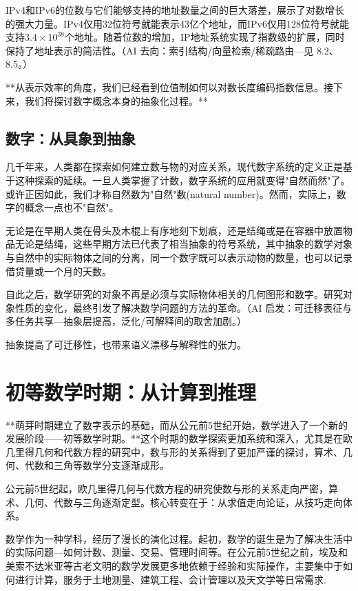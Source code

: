 IPv4和IPv6的位数与它们能够支持的地址数量之间的巨大落差，展示了对数增长的强大力量。IPv4仅用32位符号就能表示43亿个地址，而IPv6仅用128位符号就能支持{\bf $3.4 \times 10^{38}$}个地址。随着位数的增加，IP地址系统实现了指数级的扩展，同时保持了地址表示的简洁性。{（AI 去向：索引结构/向量检索/稀疏路由—见 8.2、8.5。）}

**从表示效率的角度，我们已经看到位值制如何以对数长度编码指数信息。接下来，我们将探讨数字概念本身的抽象化过程。**

\subsection{数字：从具象到抽象}


几千年来，人类都在探索如何建立数与物的对应关系，现代数字系统的定义正是基于这种探索的延续。一旦人类掌握了计数，数字系统的应用就变得"自然而然"了。或许正因如此，我们才称自然数为"自然"数(natural number)。然而，实际上，数字的概念一点也不"自然"。

无论是在早期人类在骨头及木棍上有序地刻下划痕，还是结绳或是在容器中放置物品无论是结绳，这些早期方法已代表了相当抽象的符号系统，其中抽象的数学对象与自然中的实际物体之间的分离，同一个数字既可以表示动物的数量，也可以记录借贷量或一个月的天数。

自此之后，数学研究的对象不再是必须与实际物体相关的几何图形和数字。研究对象性质的变化，最终引发了解决数学问题的方法的革命。{（AI 启发：可迁移表征与多任务共享—抽象层提高，泛化/可解释间的取舍加剧。）}

抽象提高了可迁移性，也带来语义漂移与解释性的张力。

\section{初等数学时期：从计算到推理}


**萌芽时期建立了数字表示的基础，而从公元前5世纪开始，数学进入了一个新的发展阶段——初等数学时期。**这个时期的数学探索更加系统和深入，尤其是在欧几里得几何和代数方程的研究中，数与形的关系得到了更加严谨的探讨，算术、几何、代数和三角等数学分支逐渐成形。

公元前5世纪起，欧几里得几何与代数方程的研究使数与形的关系走向严密，算术、几何、代数与三角逐渐定型。核心转变在于：从求值走向论证，从技巧走向体系。

数学作为一种学科，经历了漫长的演化过程。起初，数学的诞生是为了解决生活中的实际问题---如何计数、测量、交易、管理时间等。在公元前5世纪之前，埃及和美索不达米亚等古老文明的数学发展更多地依赖于经验和实际操作，主要集中于如何进行计算，服务于土地测量、建筑工程、会计管理以及天文学等日常需求.

